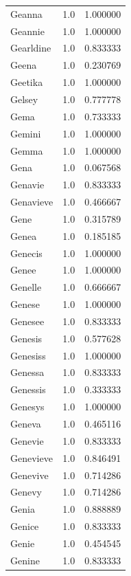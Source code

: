 \documentclass[
  letterpaper,
  DIV=11,
  numbers=noendperiod]{scrreprt}
\begin{document}
\begin{tabular}{lrr}
Geanna          &   1.0 &   1.000000 \\
Geannie         &   1.0 &   1.000000 \\
Gearldine       &   1.0 &   0.833333 \\
Geena           &   1.0 &   0.230769 \\
Geetika         &   1.0 &   1.000000 \\
Gelsey          &   1.0 &   0.777778 \\
Gema            &   1.0 &   0.733333 \\
Gemini          &   1.0 &   1.000000 \\
Gemma           &   1.0 &   1.000000 \\
Gena            &   1.0 &   0.067568 \\
Genavie         &   1.0 &   0.833333 \\
Genavieve       &   1.0 &   0.466667 \\
Gene            &   1.0 &   0.315789 \\
Genea           &   1.0 &   0.185185 \\
Genecis         &   1.0 &   1.000000 \\
Genee           &   1.0 &   1.000000 \\
Genelle         &   1.0 &   0.666667 \\
Genese          &   1.0 &   1.000000 \\
Genesee         &   1.0 &   0.833333 \\
Genesis         &   1.0 &   0.577628 \\
Genesiss        &   1.0 &   1.000000 \\
Genessa         &   1.0 &   0.833333 \\
Genessis        &   1.0 &   0.333333 \\
Genesys         &   1.0 &   1.000000 \\
Geneva          &   1.0 &   0.465116 \\
Genevie         &   1.0 &   0.833333 \\
Genevieve       &   1.0 &   0.846491 \\
Genevive        &   1.0 &   0.714286 \\
Genevy          &   1.0 &   0.714286 \\
Genia           &   1.0 &   0.888889 \\
Genice          &   1.0 &   0.833333 \\
Genie           &   1.0 &   0.454545 \\
Genine          &   1.0 &   0.833333 \\

\end{tabular}
\end{document}
